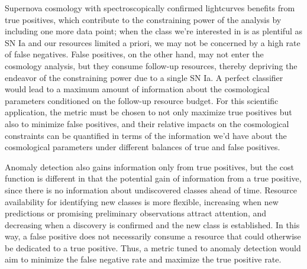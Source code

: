 Supernova cosmology with spectroscopically confirmed lightcurves benefits from true positives, which contribute to the constraining power of the analysis by including one more data point; when the class we're interested in is as plentiful as SN Ia and our resources limited a priori, we may not be concerned by a high rate of false negatives.
False positives, on the other hand, may not enter the cosmology analysis, but they consume follow-up resources, thereby depriving the endeavor of the constraining power due to a single SN Ia.
A perfect classifier would lead to a maximum amount of information about the cosmological parameters conditioned on the follow-up resource budget.
For this scientific application, the metric must be chosen to not only maximize true positives but also to minimize false positives, and their relative impacts on the cosmological constraints can be quantified in terms of the information we'd have about the cosmological parameters under different balances of true and false positives.

Anomaly detection also gains information only from true positives, but the cost function is different in that the potential gain of information from a true positive, since there is no information about undiscovered classes ahead of time.
Resource availability for identifying new classes is more flexible, increasing when new predictions or promising preliminary observations attract attention, and decreasing when a discovery is confirmed and the new class is established.
In this way, a false positive does not necessarily consume a resource that could otherwise be dedicated to a true positive.
Thus, a metric tuned to anomaly detection would aim to minimize the false negative rate and maximize the true positive rate.

